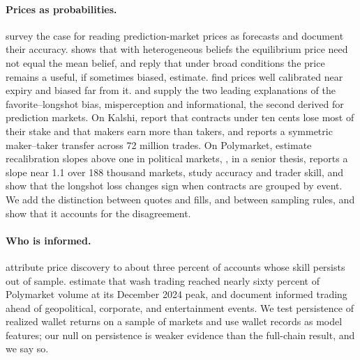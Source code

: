\documentclass[format=acmsmall, review=false]{acmart}
\begin{document}
\paragraph{Prices as probabilities.} \citet{wolfers2004prediction} survey the case for reading prediction-market prices as forecasts and document their accuracy. \citet{manski2006interpreting} shows that with heterogeneous beliefs the equilibrium price need not equal the mean belief, and \citet{wolfers2006interpreting} reply that under broad conditions the price remains a useful, if sometimes biased, estimate. \citet{page2013prediction} find prices well calibrated near expiry and biased far from it. \citet{snowberg2010explaining} and \citet{ottaviani2015price} supply the two leading explanations of the favorite--longshot bias, misperception and informational, the second derived for prediction markets. On Kalshi, \citet{burgi2026makers} report that contracts under ten cents lose most of their stake and that makers earn more than takers, and \citet{becker2026microstructure} reports a symmetric maker--taker transfer across 72 million trades. On Polymarket, \citet{le2026decomposing} estimate recalibration slopes above one in political markets, \citet{walker2026price}, in a senior thesis, reports a slope near 1.1 over 188 thousand markets, \citet{reichenbach2025exploring} study accuracy and trader skill, and \citet{cardozo2026favorite} show that the longshot loss changes sign when contracts are grouped by event. We add the distinction between quotes and fills, and between sampling rules, and show that it accounts for the disagreement.

\paragraph{Who is informed.} \citet{gomezcram2026prediction} attribute price discovery to about three percent of accounts whose skill persists out of sample. \citet{sirolly2025network} estimate that wash trading reached nearly sixty percent of Polymarket volume at its December 2024 peak, and \citet{mitts2026iran} document informed trading ahead of geopolitical, corporate, and entertainment events. We test persistence of realized wallet returns on a sample of markets and use wallet records as model features; our null on persistence is weaker evidence than the full-chain result, and we say so.
\end{document}
